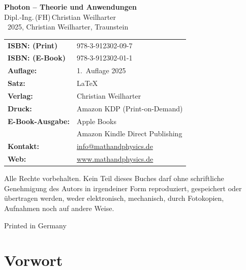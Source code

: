 \cleardoublepage
\thispagestyle{empty}
\begin{center}


{\Large\textbf{Photon – Theorie und Anwendungen}}\\[1.2em]
{\large Dipl.-Ing.\,(FH)\,Christian Weilharter}\\[1.2em]
\textcopyright~2025, Christian Weilharter, Traunstein\\[2em]
\end{center}
\begin{flushleft}
	\begin{tabular}{@{}l l}
	
	
		\textbf{ISBN: (Print)} & 978-3-912302-09-7 \\[0.5em]
			\textbf{ISBN: (E-Book)} & 978-3-912302-01-1 \\[0.5em]
		\textbf{Auflage:} & 1.~Auflage 2025 \\[0.5em]
		\textbf{Satz:} & \LaTeX \\[0.5em]
		\textbf{Verlag:} & Christian Weilharter \\[0.5em]
		\textbf{Druck:} & Amazon KDP (Print-on-Demand) \\[0.5em]

			\textbf{E-Book-Ausgabe:} & Apple Books\\[0.5em]
			&Amazon Kindle Direct Publishing \\[0.5em]
		\textbf{Kontakt:} & \href{mailto:info@mathandphysics.de}{info@mathandphysics.de}\\[0.5em]
		\textbf{Web:} & \href{https://www.mathandphysics.de}{www.mathandphysics.de}\\
		

	\end{tabular}
\end{flushleft}

\vspace{2em}
\noindent
Alle Rechte vorbehalten. Kein Teil dieses Buches darf ohne schriftliche Genehmigung des Autors 
in irgendeiner Form reproduziert, gespeichert oder übertragen werden, 
weder elektronisch, mechanisch, durch Fotokopien, Aufnahmen noch auf andere Weise.
\begin{center}\small Printed in Germany\end{center}

\cleardoublepage

\chapter*{Vorwort}



